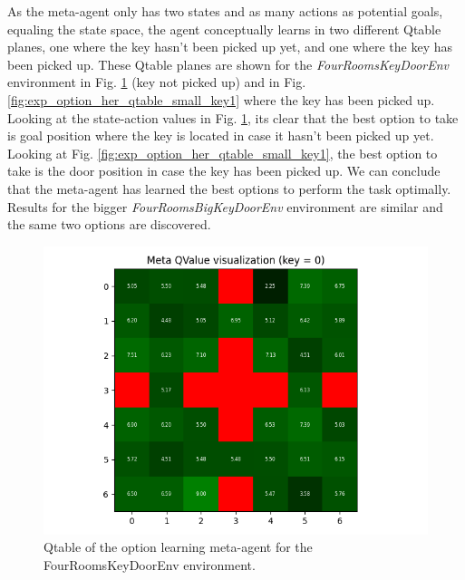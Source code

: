\documentclass[conference]{IEEEtran}
\begin{document}
As the meta-agent only has two states and as many actions as potential goals, equaling the state space, the agent conceptually learns in two different Qtable planes, one where the key hasn't been picked up yet, and one where the key has been picked up. These Qtable planes are shown for the \textit{FourRoomsKeyDoorEnv} environment in Fig. \ref{fig:exp_option_her_qtable_small_key0} (key not picked up) and in Fig. \ref{fig:exp_option_her_qtable_small_key1} where the key has been picked up. Looking at the state-action values in Fig. \ref{fig:exp_option_her_qtable_small_key0}, its clear that the best option to take is goal position where the key is located in case it hasn't been picked up yet. Looking at Fig. \ref{fig:exp_option_her_qtable_small_key1}, the best option to take is the door position in case the key has been picked up. We can conclude that the meta-agent has learned the best options to perform the task optimally. Results for the bigger \textit{FourRoomsBigKeyDoorEnv} environment are similar and the same two options are discovered.

\begin{figure}[ht]
\centering
\includegraphics[width=0.9\columnwidth]{img/exp_option_her_qtable_small_key0.png}
\caption{Qtable of the option learning meta-agent for the FourRoomsKeyDoorEnv environment.}
\label{fig:exp_option_her_qtable_small_key0}
\end{figure}
\end{document}

